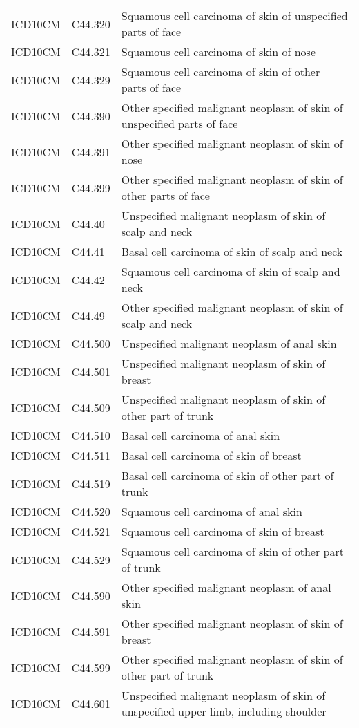 \begin{longtable}{p{}p{}p{}}
  ICD10CM & C44.320 & Squamous cell carcinoma of skin of unspecified parts of face \\ 
  ICD10CM & C44.321 & Squamous cell carcinoma of skin of nose \\ 
  ICD10CM & C44.329 & Squamous cell carcinoma of skin of other parts of face \\ 
  ICD10CM & C44.390 & Other specified malignant neoplasm of skin of unspecified parts of face \\ 
  ICD10CM & C44.391 & Other specified malignant neoplasm of skin of nose \\ 
  ICD10CM & C44.399 & Other specified malignant neoplasm of skin of other parts of face \\ 
  ICD10CM & C44.40 & Unspecified malignant neoplasm of skin of scalp and neck \\ 
  ICD10CM & C44.41 & Basal cell carcinoma of skin of scalp and neck \\ 
  ICD10CM & C44.42 & Squamous cell carcinoma of skin of scalp and neck \\ 
  ICD10CM & C44.49 & Other specified malignant neoplasm of skin of scalp and neck \\ 
  ICD10CM & C44.500 & Unspecified malignant neoplasm of anal skin \\ 
  ICD10CM & C44.501 & Unspecified malignant neoplasm of skin of breast \\ 
  ICD10CM & C44.509 & Unspecified malignant neoplasm of skin of other part of trunk \\ 
  ICD10CM & C44.510 & Basal cell carcinoma of anal skin \\ 
  ICD10CM & C44.511 & Basal cell carcinoma of skin of breast \\ 
  ICD10CM & C44.519 & Basal cell carcinoma of skin of other part of trunk \\ 
  ICD10CM & C44.520 & Squamous cell carcinoma of anal skin \\ 
  ICD10CM & C44.521 & Squamous cell carcinoma of skin of breast \\ 
  ICD10CM & C44.529 & Squamous cell carcinoma of skin of other part of trunk \\ 
  ICD10CM & C44.590 & Other specified malignant neoplasm of anal skin \\ 
  ICD10CM & C44.591 & Other specified malignant neoplasm of skin of breast \\ 
  ICD10CM & C44.599 & Other specified malignant neoplasm of skin of other part of trunk \\ 
  ICD10CM & C44.601 & Unspecified malignant neoplasm of skin of unspecified upper limb, including shoulder \\ 

\end{longtable}
